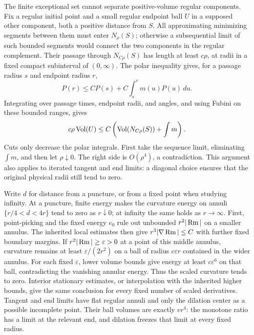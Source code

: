 The finite exceptional set cannot separate positive-volume regular
components. Fix a regular initial point and a small regular endpoint
ball $U$ in a supposed other component, both a positive distance from
$S$. All approximating minimizing segments between them must enter
$N_\rho(S)$; otherwise a subsequential limit of such bounded segments
would connect the two components in the regular complement.
Their passage through $N_{C\rho}(S)$ has length at least $c\rho$,
at radii in a fixed compact subinterval of $(0,\infty)$.
The polar inequality gives, for a passage radius $s$ and endpoint
radius $r$,
\[
 P(r)\leq C P(s)+C\int_s^r m(u)P(u)\,du.
\]
Integrating over passage times, endpoint radii, and angles, and using
Fubini on these bounded ranges, gives
\begin{equation}\label{geom:nonseparation}
 c\rho\operatorname{Vol}(U)\leq
 C\left(\operatorname{Vol}(N_{C\rho}(S))+\int m\right).
\end{equation}
Cuts only decrease the polar integrals. First take the sequence
limit, eliminating $\int m$, and then let $\rho\downarrow0$.
The right side is $O(\rho^4)$, a contradiction. This argument also
applies to iterated tangent and end limits: a diagonal choice ensures
that the original physical radii still tend to zero.

Write $d$ for distance from a puncture, or from a fixed point when
studying infinity. At a puncture, finite energy makes the curvature
energy on annuli $\{r/4<d<4r\}$ tend to zero as $r\downarrow0$; at infinity the same
holds as $r\to\infty$. First, point-picking and the fixed energy
$e_0$ rule out unbounded $r^2|\operatorname{Rm}|$ on a smaller annulus. The inherited
local estimates then give $r^3|\nabla\operatorname{Rm}|\le C$ with further fixed
boundary margins. If $r^2|\operatorname{Rm}|\ge\varepsilon>0$ at a point of this
middle annulus, curvature remains at least $\varepsilon/(2r^2)$
on a ball of radius $c\varepsilon r$ contained in the wider annulus.
For each fixed $\varepsilon$, lower volume bounds give energy at
least $c\varepsilon^6$ on that ball, contradicting the vanishing
annular energy. Thus the scaled curvature tends to zero. Interior
stationary estimates, or interpolation with the inherited higher
bounds, give the same conclusion for every fixed number of scaled
derivatives. Tangent and end limits have flat regular annuli and only
the dilation center as a possible incomplete point. Their ball volumes
are exactly $vr^4$: the monotone ratio has a limit at the relevant end,
and dilation freezes that limit at every fixed radius.

